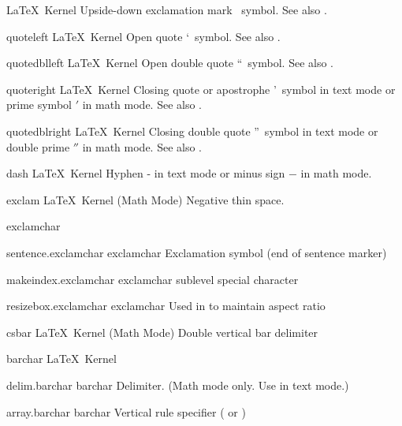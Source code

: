 %
 {\exclamdowncs}%
 {}%
 {\LaTeX\ Kernel}%
 {Upside-down exclamation mark \textexclamdown\ symbol. See also .}%
 {}

 {quoteleft}%
 {\quoteleftcs}%
 {}%
 {\LaTeX\ Kernel}%
 {Open quote \textquoteleft\ symbol. See also .}%
 {}

 {quotedblleft}%
 {\quotedblleftcs}%
 {}%
 {\LaTeX\ Kernel}%
 {Open double quote \textquotedblleft\ symbol. See also .}%
 {}

 {quoteright}%
 {\quoterightcs}%
 {}%
 {\LaTeX\ Kernel}%
 {Closing quote or apostrophe \textquoteright\ symbol in text mode 
  or prime symbol \ensuremath{'} in math mode. See also .}%
 {}

 {quotedblright}%
 {\quotedblrightcs}%
 {}%
 {\LaTeX\ Kernel}%
 {Closing double quote \textquotedblright\ symbol in text mode
  or double prime \ensuremath{''} in math mode. See also .}%
 {}

 {dash}%
 {\dashcs}%
 {}%
 {\LaTeX\ Kernel}%
 {Hyphen - in text mode or minus sign $-$ in math mode.}%
 {}

 {exclam}
 {\exclamsym}
 {}
 {\LaTeX\ Kernel (Math Mode)}
 {Negative thin space.}
 {}

 {exclamchar}
 {\exclamsym}
 {}
 {}
 {\nopostdesc}
 {}

 {sentence.exclamchar}
 {exclamchar}
 {\exclamsym}
 {Exclamation symbol (end of sentence marker)}
 

 {makeindex.exclamchar}
 {exclamchar}
 {\exclamsym}
 { sublevel special character}

 {resizebox.exclamchar}
 {exclamchar}
 {\exclamsym}
 {Used in  to maintain aspect ratio}

 {csbar}
 {\vbarsym}
 {}
 {\LaTeX\ Kernel (Math Mode)}
 {Double vertical bar \doublebar{} delimiter}
 {}

 {barchar}
 {\vbarsym}
 {}
 {\LaTeX\ Kernel}
 {\nopostdesc}
 {}

 {delim.barchar}
 {barchar}
 {\vbarsym}
 {Delimiter. (Math mode only. Use  in text mode.)}

 {array.barchar}
 {barchar}
 {\vbarsym}
 {Vertical rule specifier ( or
   )}

